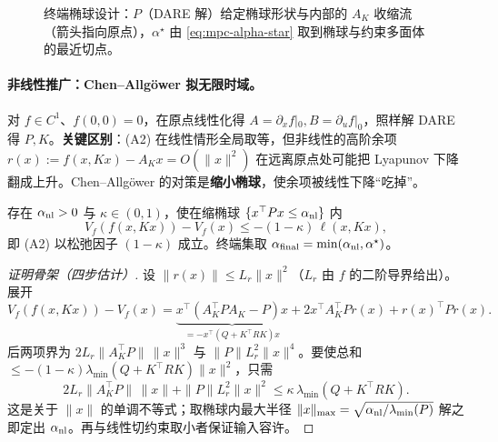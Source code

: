\begin{figure}[ht]
\centering
{}
\caption{终端椭球设计：$P$（DARE 解）给定椭球形状与内部的 $A_K$ 收缩流（箭头指向原点），$\alpha^\star$ 由 \cref{eq:mpc-alpha-star} 取到椭球与约束多面体的最近切点。}
\label{fig:mpc-terminal-ellipse}
\end{figure}

\paragraph{非线性推广：Chen--Allgöwer 拟无限时域。}
对 $f\in C^1$、$f(0,0)=0$，在原点线性化得 $A=\partial_xf|_0,B=\partial_uf|_0$，照样解 DARE 得 $P,K$。\textbf{关键区别}：(A2) 在线性情形全局取等，但非线性的高阶余项 $r(x):=f(x,Kx)-A_Kx=O(\|x\|^2)$ 在远离原点处可能把 Lyapunov 下降翻成上升。Chen--Allgöwer 的对策是\textbf{缩小椭球}，使余项被线性下降“吃掉”。

\begin{theorem}
\label{thm:mpc-chen-allgower}
存在 $\alpha_{\rm nl}>0$ 与 $\kappa\in(0,1)$，使在缩椭球 $\{x^\top Px\le\alpha_{\rm nl}\}$ 内
\[
  V_f(f(x,Kx))-V_f(x)\le-(1-\kappa)\,\ell(x,Kx),
\]
即 (A2) 以松弛因子 $(1-\kappa)$ 成立。终端集取 $\alpha_{\rm final}=\min(\alpha_{\rm nl},\alpha^\star)$。
\end{theorem}

\begin{proof}[证明骨架（四步估计）]
设 $\|r(x)\|\le L_r\|x\|^2$（$L_r$ 由 $f$ 的二阶导界给出）。展开
\[
  V_f(f(x,Kx))-V_f(x)=\underbrace{x^\top(A_K^\top PA_K-P)x}_{=-x^\top(Q+K^\top RK)x}+2x^\top A_K^\top Pr(x)+r(x)^\top Pr(x).
\]
后两项界为 $2L_r\|A_K^\top P\|\,\|x\|^3$ 与 $\|P\|L_r^2\|x\|^4$。要使总和 $\le-(1-\kappa)\lambda_{\min}(Q+K^\top RK)\|x\|^2$，只需
\[
  2L_r\|A_K^\top P\|\,\|x\|+\|P\|L_r^2\|x\|^2\le\kappa\,\lambda_{\min}(Q+K^\top RK).
\]
这是关于 $\|x\|$ 的单调不等式；取椭球内最大半径 $\|x\|_{\max}=\sqrt{\alpha_{\rm nl}/\lambda_{\min}(P)}$ 解之即定出 $\alpha_{\rm nl}$。再与线性切约束取小者保证输入容许。
\end{proof}

